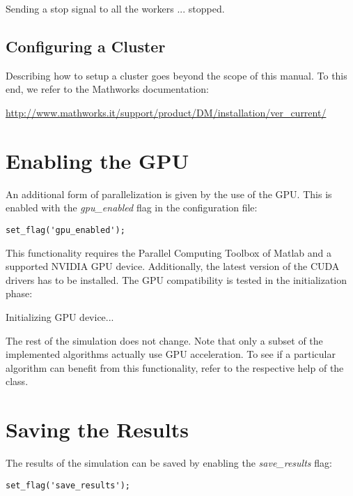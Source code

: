 \begin{console}
Sending a stop signal to all the workers ... stopped.
\end{console}

\subsection{Configuring a Cluster}

Describing how to setup a cluster goes beyond the scope of this manual. To this end, we refer to the Mathworks documentation:

\url{http://www.mathworks.it/support/product/DM/installation/ver_current/}

\section{Enabling the GPU}

An additional form of parallelization is given by the use of the GPU. This is enabled with the \textit{gpu\_enabled} flag in the configuration file:

\begin{lstlisting}
set_flag('gpu_enabled');
\end{lstlisting}

\noindent This functionality requires the Parallel Computing Toolbox of Matlab and a supported NVIDIA GPU device. Additionally, the latest version of the CUDA drivers has to be installed. The GPU compatibility is tested in the initialization phase:

\begin{console}
Initializing GPU device...
\end{console}

\noindent The rest of the simulation does not change. Note that only a subset of the implemented algorithms actually use GPU acceleration. To see if a particular algorithm can benefit from this functionality, refer to the respective help of the class.

\section{Saving the Results}

The results of the simulation can be saved by enabling the \textit{save\_results} flag:

\begin{lstlisting}
set_flag('save_results');
\end{lstlisting}


